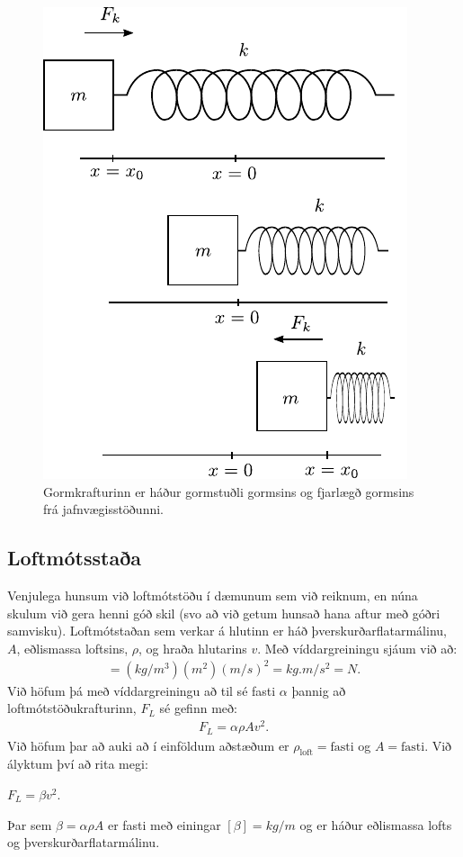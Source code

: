 \begin{figure}[H]
    \centering
    \includegraphics{figures/gormur.pdf}
    \caption{Gormkrafturinn er háður gormstuðli gormsins og fjarlægð gormsins frá jafnvægisstöðunni.}
    \label{fig:gormur.pdf}
\end{figure}

\subsection*{Loftmótsstaða}

Venjulega hunsum við loftmótstöðu í dæmunum sem við reiknum, en núna skulum við gera henni góð skil (svo að við getum hunsað hana aftur með góðri samvisku). Loftmótstaðan sem verkar á hlutinn er háð þverskurðarflatarmálinu, $A$, eðlismassa loftsins, $\rho$, og hraða hlutarins $v$. Með víddargreiningu sjáum við að:
\begin{align*}
    [\rho A v^2] = (\si{kg/m^3}) (\si{m^2}) (\si{m/s})^2 = \si{kg.m/s^2} = \si{N}.
\end{align*}
Við höfum þá með víddargreiningu að til sé fasti $\alpha$ þannig að loftmótstöðukrafturinn, $F_L$ sé gefinn með:
\begin{align*}
    F_L = \alpha \rho A v^2.
\end{align*}
Við höfum þar að auki að í einföldum aðstæðum er $\rho_{\text{loft}} = \text{fasti}$ og $A = \text{fasti}$. Við ályktum því að rita megi:
\begin{center}
\begin{tcbox}[nobeforeafter]{$F_L = \beta v^2.$}
\end{tcbox}
\end{center}
Þar sem $\beta = \alpha \rho A$ er fasti með einingar $[\beta] = \si{kg/m}$ og er háður eðlismassa lofts og þverskurðarflatarmálinu.


